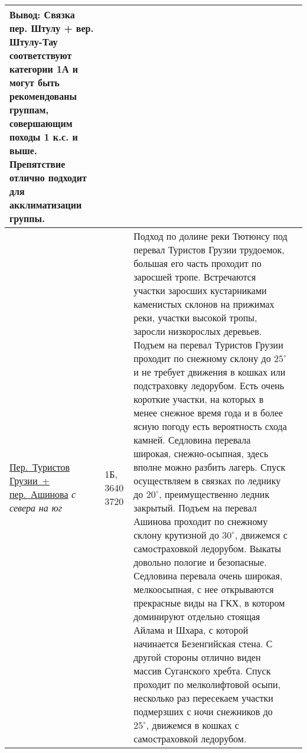{\begin{longtable}{|>{\centering\arraybackslash}m{4.5cm}|>{\centering\arraybackslash}m{1.8cm}|>{\raggedright\arraybackslash}m{9.6cm}|>{\centering\arraybackslash}m{1.2cm}|}
		 	\textbf{Вывод:} {\small Связка пер. Штулу + вер. Штулу-Тау соответствуют категории 1А и могут быть рекомендованы группам, совершающим походы 1 к.с. и выше. Препятствие отлично подходит для акклиматизации группы.} 																																																																																																																																																																																																																																																																																	&			\\ \hline
		 	\hyperref[subsec:Day4]{{\small Пер.~Туристов Грузии~+ пер.~Ашинова}}											\newline\textit{с севера на юг}			&	1Б, 3640 3720				&	{\small Подход по долине реки Тютюнсу под перевал Туристов Грузии трудоемок, большая его часть проходит по заросшей тропе. Встречаются участки заросших кустарниками каменистых склонов на прижимах реки, участки высокой тропы, заросли низкорослых деревьев. Подъем на перевал Туристов Грузии проходит по снежному склону до $25^\circ$ и не требует движения в кошках или подстраховку ледорубом. Есть очень короткие участки, на которых в менее снежное время года и в более ясную погоду есть вероятность схода камней. Седловина перевала широкая, снежно-осыпная, здесь вполне можно разбить лагерь. Спуск осуществляем в связках по леднику до $20^\circ$, преимущественно ледник закрытый. Подъем на перевал Ашинова проходит по снежному склону крутизной до $30^\circ$, движемся с самостраховкой ледорубом. Выкаты довольно пологие и безопасные. Седловина перевала очень широкая, мелкоосыпная, с нее открываются прекрасные виды на ГКХ, в котором доминируют отдельно стоящая Айлама и Шхара, с которой начинается Безенгийская стена. С другой стороны отлично виден массив Суганского хребта. Спуск проходит по мелколифтовой осыпи, несколько раз пересекаем участки подмерзших с ночи снежников до $25^\circ$, движемся в кошках с самостраховкой ледорубом.
		 	
}
\end{longtable}}
